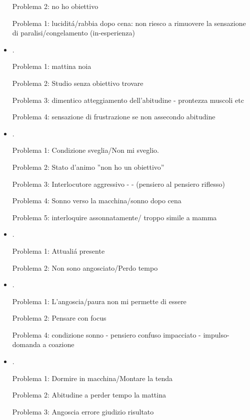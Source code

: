 \begin{itemize}
Problema 2: no ho obiettivo

Problema 1: lucidit\'a/rabbia dopo cena: non riesco a rimuovere la sensazione di paralisi/congelamento (in-esperienza)

\item {}.

Problema 1: mattina noia

Problema 2: Studio senza obiettivo trovare

Problema 3: dimentico atteggiamento dell'abitudine - prontezza muscoli etc

Problema 4: sensazione di frustrazione se non assecondo abitudine

\item {}.

Problema 1: Condizione sveglia/Non mi sveglio.

Problema 2: Stato d'animo ''non ho un obiettivo''

Problema 3: Interlocutore aggressivo -  -  (pensiero al pensiero riflesso)

Problema 4: Sonno verso la macchina/sonno dopo cena

Problema 5: interloquire assonnatamente/ troppo simile a mamma

\item {}.

Problema 1: Attuali\'a presente

Problema 2: Non sono angosciato/Perdo tempo

\item {}.

Problema 1: L'angoscia/paura non mi permette di essere

Problema 2: Pensare con focus 

Problema 4: condizione sonno - pensiero confuso impacciato - impulso-domanda a coazione

\item {}.

Problema 1: Dormire in macchina/Montare la tenda

Problema 2: Abitudine a perder tempo la mattina

Problema 3: Angoscia errore giudizio risultato


\end{itemize}
